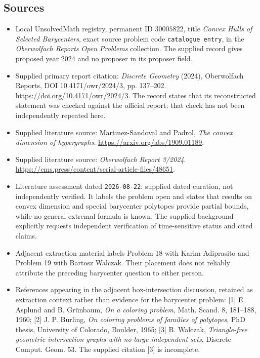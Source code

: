 \documentclass[11pt]{article}
\begin{document}
\subsection{Sources}
\begin{itemize}
\item Local UnsolvedMath registry, permanent ID \(30005822\), title \emph{Convex Hulls of Selected Barycenters}, exact source problem code \texttt{catalogue entry}, in the \emph{Oberwolfach Reports Open Problems} collection. The supplied record gives proposed year 2024 and no proposer in its proposer field.
\item Supplied primary report citation: \emph{Discrete Geometry} (2024), Oberwolfach Reports, DOI 10.4171/owr/2024/3, pp. 137--202. \url{https://doi.org/10.4171/owr/2024/3}. The record states that its reconstructed statement was checked against the official report; that check has not been independently repeated here.
\item Supplied literature source: Martinez-Sandoval and Padrol, \emph{The convex dimension of hypergraphs}. \url{https://arxiv.org/abs/1909.01189}.
\item Supplied literature source: \emph{Oberwolfach Report 3/2024}. \url{https://ems.press/content/serial-article-files/48651}.
\item Literature assessment dated \texttt{2026-08-22}: supplied dated curation, not independently verified. It labels the problem open and states that results on convex dimension and special barycenter polytopes provide partial bounds, while no general extremal formula is known. The supplied background explicitly requests independent verification of time-sensitive status and cited claims.
\item Adjacent extraction material labels Problem 18 with Karim Adiprasito and Problem 19 with Bartosz Walczak. Their placement does not reliably attribute the preceding barycenter question to either person.
\item References appearing in the adjacent box-intersection discussion, retained as extraction context rather than evidence for the barycenter problem: [1] E. Asplund and B. Gr\"unbaum, \emph{On a coloring problem}, Math. Scand. 8, 181--188, 1960; [2] J. P. Burling, \emph{On coloring problems of families of polytopes}, PhD thesis, University of Colorado, Boulder, 1965; [3] B. Walczak, \emph{Triangle-free geometric intersection graphs with no large independent sets}, Discrete Comput. Geom. 53. The supplied citation [3] is incomplete.
\end{itemize}
\end{document}
